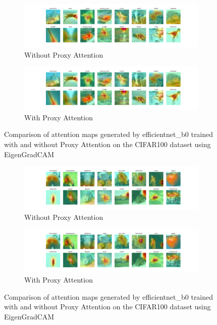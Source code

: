 \documentclass[a4paper,11pt,openright]{book}
\begin{document}
\begin{figure}[!htb]
    \centering
    \begin{subfigure}[b]{1\textwidth}
        \includegraphics[width=\textwidth]{images/cifar100_efficientnet_b0_noproxy_2.pdf}
        \caption{Without Proxy Attention}
    \end{subfigure}
    \hfill
    \begin{subfigure}[b]{1\textwidth}
        \includegraphics[width=\textwidth]{images/cifar100_efficientnet_b0_proxy_2.pdf}
        \caption{With Proxy Attention}
    \end{subfigure}
    \caption{Comparison of attention maps generated by efficientnet\_b0 trained with and without Proxy Attention on the CIFAR100 dataset using EigenGradCAM}
\end{figure}


\begin{figure}[!htb]
    \centering
    \begin{subfigure}[b]{1\textwidth}
        \includegraphics[width=\textwidth]{images/cifar100_efficientnet_b0_noproxy_3.pdf}
        \caption{Without Proxy Attention}
    \end{subfigure}
    \hfill
    \begin{subfigure}[b]{1\textwidth}
        \includegraphics[width=\textwidth]{images/cifar100_efficientnet_b0_proxy_3.pdf}
        \caption{With Proxy Attention}
    \end{subfigure}
    \caption{Comparison of attention maps generated by efficientnet\_b0 trained with and without Proxy Attention on the CIFAR100 dataset using EigenGradCAM}
\end{figure}
\end{document}
